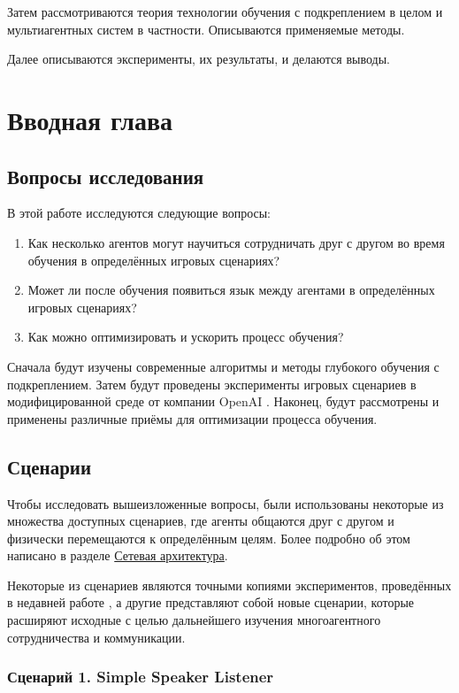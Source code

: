 Затем рассмотриваются теория технологии обучения с подкреплением в целом и мультиагентных систем в частности. Описываются применяемые методы.

Далее описываются эксперименты, их результаты, и делаются выводы.

\chapter{Вводная глава}

\section{Вопросы исследования} \label{intro-questions}

В этой работе исследуются следующие вопросы:
\begin{enumerate}[1.]
	\item Как несколько агентов могут научиться сотрудничать друг с другом во время обучения в определённых игровых сценариях?
	\item Может ли после обучения появиться язык между агентами в определённых игровых сценариях?
	\item Как можно оптимизировать и ускорить процесс обучения?
\end{enumerate}

Сначала будут изучены современные алгоритмы и методы глубокого обучения с подкреплением. Затем будут проведены эксперименты игровых сценариев в модифицированной среде от компании OpenAI \cite{OpenAI-Gym}. Наконец, будут рассмотрены и применены различные приёмы для оптимизации процесса обучения.

\section{Сценарии} \label{intro:sec2}

Чтобы исследовать вышеизложенные вопросы, были использованы некоторые из множества доступных сценариев, где агенты общаются друг с другом и физически перемещаются к определённым целям. Более подробно об этом написано в разделе \hyperref[network-architecture]{Сетевая архитектура}.

Некоторые из сценариев являются точными копиями экспериментов, проведённых в недавней работе \cite{lowe2017multiagent}, а другие представляют собой новые сценарии, которые расширяют исходные с целью дальнейшего изучения многоагентного сотрудничества и коммуникации.

\subsection{Сценарий 1. Simple Speaker Listener} \label{intro:ssl}

